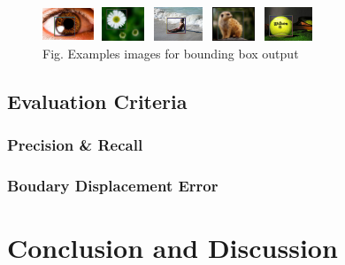 \documentclass[10pt,twocolumn,letterpaper]{article}
\begin{document}
\begin{figure}
\begin{center}
    \includegraphics[width=0.6in,height=0.4in]{./Figures/boundingbox/5_155_155096RECT.jpg}
    \includegraphics[width=0.6in,height=0.4in]{./Figures/boundingbox/5_155_155145RECT.jpg}
    \includegraphics[width=0.6in,height=0.4in]{./Figures/boundingbox/5_155_155333RECT.jpg}
    \includegraphics[width=0.6in,height=0.4in]{./Figures/boundingbox/5_155_155196RECT.jpg}
    \includegraphics[width=0.6in,height=0.4in]{./Figures/boundingbox/5_155_155459RECT.jpg} \\
    \footnotesize Fig. Examples images for bounding box output
\end{center}
\end{figure}


\subsection{Evaluation Criteria}

\subsubsection{Precision \& Recall}
\subsubsection{Boudary Displacement Error}

\section{Conclusion and Discussion}
\end{document}
